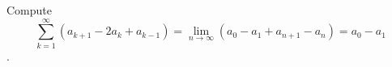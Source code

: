 \begin{Exercise}
\begin{solution}
Compute
$$
\sum_{k=1}^{\infty} \left(a_{k+1}-2a_k+a_{k-1}\right) 
= \lim_{n\to\infty} \left(a_0-a_1+a_{n+1}-a_n\right) 
= a_0-a_1
$$.
\end{solution}
\end{Exercise}